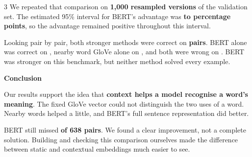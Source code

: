 \documentclass{article}
\newcommand{\sectiontitle}[1]{%
  \Needspace{4\baselineskip}%
  \par\vspace{5mm}%
  {\fontsize{30}{35}\selectfont\bfseries\textcolor{trierblue}{#1}\par}%
  \vspace{6mm}%
}
\begin{document}
\begin{multicols}{3}
We repeated that comparison on \textbf{1,000 resampled versions} of the validation set. The estimated 95\% interval for BERT's advantage was \textbf{\GainLower{} to \GainUpper{} percentage points}, so the advantage remained positive throughout this interval.

Looking pair by pair, both stronger methods were correct on \textbf{\BothCorrectCount{} pairs}. BERT alone was correct on \textbf{\BertOnlyCount}, nearby word GloVe alone on \textbf{\StaticOnlyCount}, and both were wrong on \textbf{\BothWrongCount}. BERT was stronger on this benchmark, but neither method solved every example.

\sectiontitle{Conclusion}
Our results support the idea that \textbf{context helps a model recognise a word's meaning}. The fixed GloVe vector could not distinguish the two uses of a word. Nearby words helped a little, and BERT's full sentence representation did better.

BERT still missed \textbf{\BertErrorCount{} of 638 pairs}. We found a clear improvement, not a complete solution. Building and checking this comparison ourselves made the difference between static and contextual embeddings much easier to see.

\end{multicols}
\end{document}

